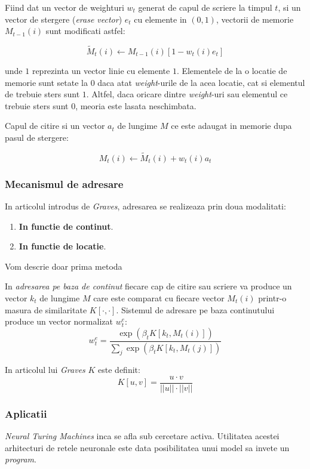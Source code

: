 \documentclass[12pt]{article}
\begin{document}
Fiind dat un vector de weighturi $w_t$ generat de capul de scriere la timpul $t$, si un vector de stergere (\textit{erase vector}) $e_t$ cu elemente in $(0, 1)$, vectorii de memorie $M_{t-1}(i)$ sunt modificati astfel:

$$ \tilde{M}_t(i) \leftarrow M_{t-1}(i)[1 - w_t(i)e_t] $$

unde $1$ reprezinta un vector linie cu elemente $1$. Elementele de la o locatie de memorie sunt setate la $0$ daca atat \textit{weight}-urile de la acea locatie, cat si elementul de trebuie sters sunt $1$. Altfel, daca oricare dintre \textit{weight}-uri sau elementul ce trebuie sters sunt $0$, meoria este lasata neschimbata. 

Capul de citire si un vector $a_t$ de lungime $M$ ce este adaugat in memorie dupa pasul de stergere:

$$ M_t(i) \leftarrow \tilde{M}_t(i) + w_t(i)a_t $$

\subsubsection{Mecanismul de adresare}

In articolul introdus de \textit{Graves}, adresarea se realizeaza prin doua modalitati:
\begin{enumerate}
	\item \textbf{In functie de continut}.
	\item \textbf{In functie de locatie}. 
\end{enumerate}

Vom descrie doar prima metoda

In \textit{adresarea pe baza de continut} fiecare cap de citire sau scriere va produce un vector $k_t$ de lungime $M$ care este comparat cu fiecare vector $M_t(i)$ printr-o masura de similaritate $K[\cdot, \cdot]$. Sistemul de adresare pe baza continutului produce un vector normalizat $w_{t}^e$:
	$$ w_{t}^e = \frac{\exp{(\beta_tK[k_t, M_t(i)])}}{\sum_j \exp{(\beta_tK[k_t, M_t(j)])}}$$
	
	In articolul lui \textit{Graves} $K$ este definit:
	$$ K[u, v] = \frac{u \cdot v}{||u|| \cdot ||v||} $$
	

\subsubsection{Aplicatii}

\textit{Neural Turing Machines} inca se afla sub cercetare activa. Utilitatea acestei arhitecturi de retele neuronale este data posibilitatea unui model sa invete un \textit{program}.
\end{document}
